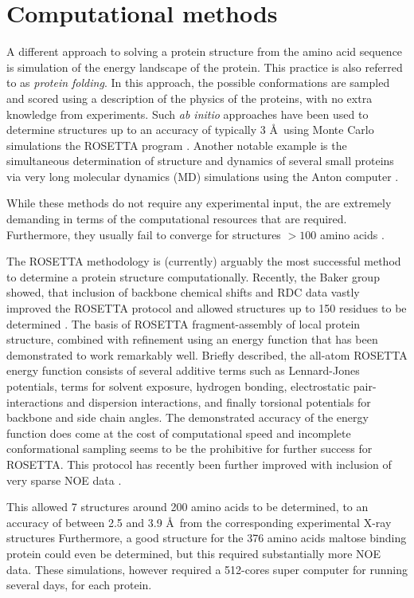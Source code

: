 \section{Computational methods}
A different approach to solving a protein structure from the amino acid sequence is simulation of the energy landscape of the protein.
This practice is also referred to as \textit{protein folding}.
In this approach, the possible conformations are sampled and scored using a description of the physics of the proteins, with no extra knowledge from experiments.
Such \textit{ab initio} approaches have been used to determine structures up to an accuracy of typically 3 \AA~using Monte Carlo simulations the ROSETTA program \cite{rosetta}.
Another notable example is the simultaneous determination of structure and dynamics of several small proteins via very long molecular dynamics (MD) simulations using the Anton computer \cite{rdcensemble}.

While these methods do not require any experimental input, the are extremely demanding in terms of the computational resources that are required.
Furthermore, they usually fail to converge for structures $>100$ amino acids \cite{Lange2012}.

The ROSETTA methodology is (currently) arguably the most successful method to determine a protein structure computationally.
Recently, the Baker group showed, that inclusion of backbone chemical shifts and RDC data vastly improved the ROSETTA protocol and allowed structures up to 150 residues to be determined \cite{Baker2010,Lange2012}.
The basis of ROSETTA fragment-assembly of local protein structure, combined with  refinement using an energy function that has been demonstrated to work remarkably well.
Briefly described, the all-atom ROSETTA energy function consists of several additive terms such as Lennard-Jones potentials, terms for solvent exposure, hydrogen bonding, electrostatic pair-interactions and dispersion interactions, and finally torsional potentials for backbone and side chain angles.
The demonstrated accuracy of the energy function does come at the cost of computational speed and incomplete conformational sampling seems to be the prohibitive for further success for ROSETTA.
This protocol has recently been further improved with inclusion of very sparse NOE data \cite{LangePNAS2012}.

This allowed 7 structures around 200 amino acids to be determined, to an accuracy of between 2.5 and 3.9 \AA~from the corresponding experimental X-ray structures
Furthermore, a good structure for the 376 amino acids maltose binding protein could even be determined, but this required substantially more NOE data.
These simulations, however required a 512-cores super computer for running several days, for each protein.

